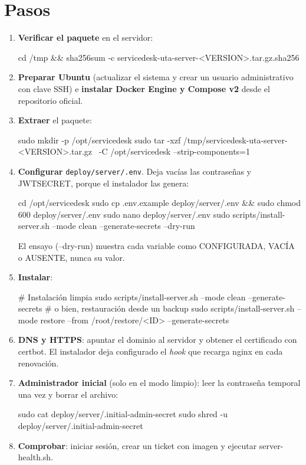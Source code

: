 \documentclass[11pt,a4paper,oneside]{report}
\newcommand{\codus}{\textunderscore\allowbreak}
\DeclareRobustCommand{\cod}[1]{{\small\ttfamily\let\_\codus #1}}
\DeclareRobustCommand{\ruta}[1]{{\small\nolinkurl{#1}}}
\begin{document}
\section{Pasos}
\begin{enumerate}[leftmargin=*]
  \item \textbf{Verificar el paquete} en el servidor:
\begin{bash}
cd /tmp && sha256sum -c servicedesk-uta-server-<VERSION>.tar.gz.sha256
\end{bash}
  \item \textbf{Preparar Ubuntu} (actualizar el sistema y crear un usuario administrativo con clave SSH) e
        \textbf{instalar Docker Engine y Compose v2} desde el repositorio oficial.
  \item \textbf{Extraer} el paquete:
\begin{bash}
sudo mkdir -p /opt/servicedesk
sudo tar -xzf /tmp/servicedesk-uta-server-<VERSION>.tar.gz \
     -C /opt/servicedesk --strip-components=1
\end{bash}
  \item \textbf{Configurar} \ruta{deploy/server/.env}. Deja vacías las contraseñas y \cod{JWT\_SECRET}, porque el instalador las genera:
\begin{bash}
cd /opt/servicedesk
sudo cp .env.example deploy/server/.env && sudo chmod 600 deploy/server/.env
sudo nano deploy/server/.env
sudo scripts/install-server.sh --mode clean --generate-secrets --dry-run
\end{bash}
        El ensayo (\cod{--dry-run}) muestra cada variable como CONFIGURADA, VACÍA o AUSENTE, nunca su valor.
  \item \textbf{Instalar}:
\begin{bash}
# Instalación limpia
sudo scripts/install-server.sh --mode clean --generate-secrets
# o bien, restauración desde un backup
sudo scripts/install-server.sh --mode restore --from /root/restore/<ID> --generate-secrets
\end{bash}
  \item \textbf{DNS y HTTPS}: apuntar el dominio al servidor y obtener el certificado con certbot. El instalador
        deja configurado el \emph{hook} que recarga nginx en cada renovación.
  \item \textbf{Administrador inicial} (solo en el modo limpio): leer la contraseña temporal una vez y borrar el archivo:
\begin{bash}
sudo cat deploy/server/.initial-admin-secret
sudo shred -u deploy/server/.initial-admin-secret
\end{bash}
  \item \textbf{Comprobar}: iniciar sesión, crear un ticket con imagen y ejecutar \cod{server-health.sh}.
\end{enumerate}
\end{document}
